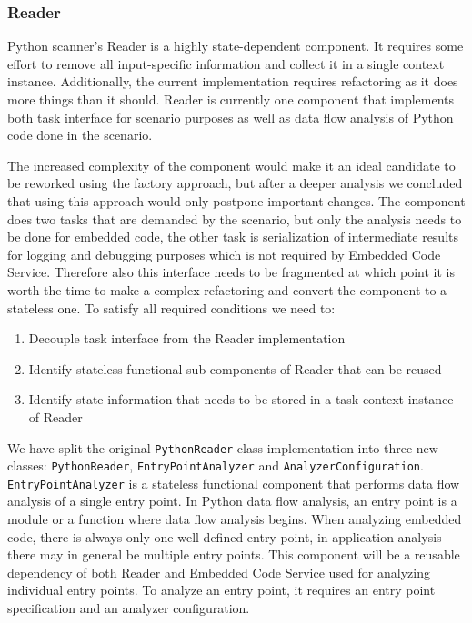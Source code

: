 \subsubsection{Reader}
Python scanner's Reader is a highly state-dependent component. It requires some effort to remove all input-specific information and collect it in a single context instance. Additionally, the current implementation requires refactoring as it does more things than it should. Reader is currently one component that implements both task interface for scenario purposes as well as data flow analysis of Python code done in the scenario.
\par
The increased complexity of the component would make it an ideal candidate to be reworked using the factory approach, but after a deeper analysis we concluded that using this approach would only postpone important changes. The component does two tasks that are demanded by the scenario, but only the analysis needs to be done for embedded code, the other task is serialization of intermediate results for logging and debugging purposes which is not required by Embedded Code Service. Therefore also this interface needs to be fragmented at which point it is worth the time to make a complex refactoring and convert the component to a stateless one. To satisfy all required conditions we need to:
\begin{enumerate}
    \item Decouple task interface from the Reader implementation
    \item Identify stateless functional sub-components of Reader that can be reused 
    \item Identify state information that needs to be stored in a task context instance of Reader
\end{enumerate}
\par
We have split the original \texttt{PythonReader} class implementation into three new classes: \texttt{PythonReader}, \texttt{EntryPointAnalyzer} and \texttt{AnalyzerConfiguration}. \texttt{EntryPointAnalyzer} is a stateless functional component that performs data flow analysis of a single entry point. In Python data flow analysis, an entry point is a module or a function where data flow analysis begins. When analyzing embedded code, there is always only one well-defined entry point, in application analysis there may in general be multiple entry points. This component will be a reusable dependency of both Reader and Embedded Code Service used for analyzing individual entry points. To analyze an entry point, it requires an entry point specification and an analyzer configuration.

